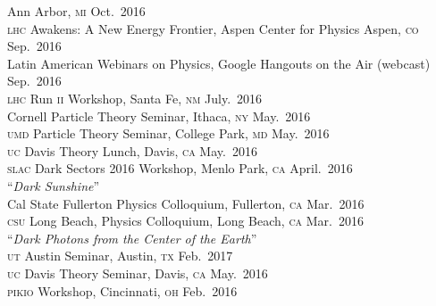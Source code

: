 \documentclass[margin,line]{resume}
\newcommand{\mytalksep}{-.1mm}
\newcommand{\mytalkskip}{2mm}
\newcommand{\scap}[1]{\textsc{\MakeLowercase{#1}}}
\begin{document}
\begin{resume}
Ann Arbor, \scap{MI}
\hfill %
Oct.~2016\vspace{\mytalksep}\\ 
%
\scap{LHC} Awakens: A New Energy Frontier,
Aspen Center for Physics
Aspen, \scap{CO}
\hfill %
Sep.~2016\vspace{\mytalksep}\\ 
%
Latin American Webinars on Physics,
Google Hangouts on the Air (webcast)
\hfill %
Sep.~2016\vspace{\mytalksep}\\ 
%
\scap{LHC} Run \scap{II} Workshop, 
Santa Fe, \scap{NM}
\hfill %
July.~2016\vspace{\mytalksep}\\ 
%
Cornell Particle Theory Seminar, 
Ithaca, \scap{NY}
\hfill %
May.~2016\vspace{\mytalksep}\\ 
%
\scap{UMD} Particle Theory Seminar, 
College Park, \scap{MD}
\hfill %
May.~2016\vspace{\mytalksep}\\ 
%
\scap{UC} Davis
Theory Lunch, Davis, \scap{CA}
\hfill %
May.~2016\vspace{\mytalksep}\\ 
%
\scap{SLAC} 
Dark Sectors 2016 Workshop, Menlo Park, \scap{CA}
\hfill %
April.~2016\vspace{\mytalkskip}\\   
%
%
%
%
``\emph{Dark Sunshine}''
\vspace{\mytalksep}\\ 
Cal State Fullerton
Physics Colloquium, Fullerton, \scap{CA}
\hfill %
Mar.~2016\vspace{\mytalksep}\\   
%
\scap{CSU} Long Beach,
Physics Colloquium,
Long Beach, \scap{CA}
\hfill %
Mar.~2016\vspace{\mytalkskip}\\
%
%
%
%
``\emph{Dark Photons from the Center of the Earth}''
\vspace{\mytalksep}\\ 
\scap{UT} Austin
Seminar, Austin, \scap{TX}
\hfill %
Feb.~2017\vspace{\mytalksep}\\ 
%
\scap{UC} Davis
Theory Seminar, Davis, \scap{CA}
\hfill %
May.~2016\vspace{\mytalksep}\\ 
%
\scap{PIKIO} 
Workshop, Cincinnati, \scap{OH}
\hfill %
Feb.~2016\vspace{\mytalksep}\\   

\end{resume}
\end{document}
